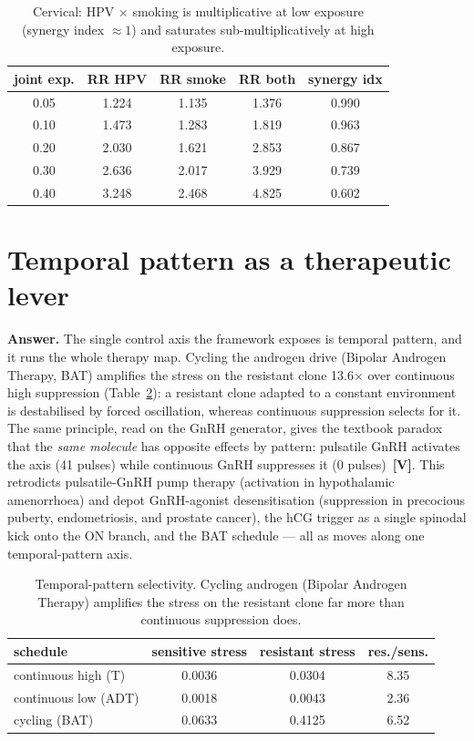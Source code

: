 \documentclass[11pt]{article}
\newcommand{\gradeV}{\textcolor{verified}{\textbf{[V]}}}
\begin{document}
\begin{table}[H]
\centering
\small
\caption{Cervical: HPV $\times$ smoking is multiplicative at low exposure (synergy index $\approx 1$) and saturates sub-multiplicatively at high exposure.}
\label{tab:cervical}
\begin{tabular}{ccccc}
\toprule
joint exp. & RR HPV & RR smoke & RR both & synergy idx \\
\midrule
0.05 & 1.224 & 1.135 & 1.376 & 0.990 \\
0.10 & 1.473 & 1.283 & 1.819 & 0.963 \\
0.20 & 2.030 & 1.621 & 2.853 & 0.867 \\
0.30 & 2.636 & 2.017 & 3.929 & 0.739 \\
0.40 & 3.248 & 2.468 & 4.825 & 0.602 \\
\bottomrule
\end{tabular}
\end{table}

\section{Temporal pattern as a therapeutic lever}

\textbf{Answer.} The single control axis the framework exposes is temporal pattern, and it runs the whole
therapy map. Cycling the androgen drive (Bipolar Androgen Therapy, BAT) amplifies the stress on the resistant
clone 13.6$\times$ over continuous high suppression (Table~\ref{tab:bat}): a resistant clone
adapted to a constant environment is destabilised by forced oscillation, whereas continuous suppression
selects for it. The same principle, read on the GnRH generator, gives the textbook paradox that the
\emph{same molecule} has opposite effects by pattern: pulsatile GnRH activates the axis
(41 pulses) while continuous GnRH suppresses it
(0 pulses)~\gradeV{}. This retrodicts pulsatile-GnRH pump therapy
(activation in hypothalamic amenorrhoea) and depot GnRH-agonist desensitisation (suppression in precocious
puberty, endometriosis, and prostate cancer), the hCG trigger as a single spinodal kick onto the ON branch,
and the BAT schedule --- all as moves along one temporal-pattern axis.

\begin{table}[H]
\centering
\small
\caption{Temporal-pattern selectivity. Cycling androgen (Bipolar Androgen Therapy) amplifies the stress on the resistant clone far more than continuous suppression does.}
\label{tab:bat}
\begin{tabular}{lccc}
\toprule
schedule & sensitive stress & resistant stress & res./sens. \\
\midrule
continuous high (T) & 0.0036 & 0.0304 & 8.35 \\
continuous low (ADT) & 0.0018 & 0.0043 & 2.36 \\
cycling (BAT) & 0.0633 & 0.4125 & 6.52 \\
\bottomrule
\end{tabular}
\end{table}
\end{document}
